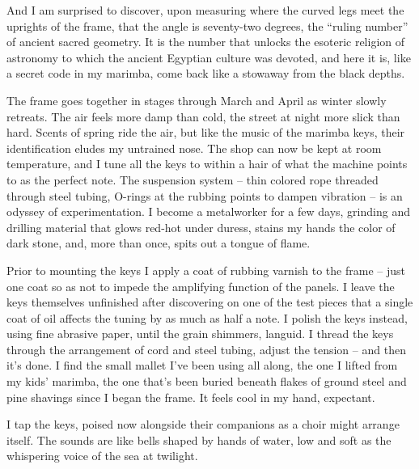 \documentclass[letterpaper,10pt,headsepline]{scrreprt}
\begin{document}
And I am surprised to discover, upon measuring where the curved legs meet the uprights of the frame, that the angle is seventy-­two degrees, the “ruling number” of ancient sacred geometry. It is the number that unlocks the esoteric religion of astronomy to which the ancient Egyptian culture was devoted, and here it is, like a secret code in my marimba, come back like a stowaway from the black depths.

The frame goes together in stages through March and April as winter slowly retreats. The air feels more damp than cold, the street at night more slick than hard. Scents of spring ride the air, but like the music of the marimba keys, their identification eludes my untrained nose. The shop can now be kept at room temperature, and I tune all the keys to within a hair of what the machine points to as the perfect note. The suspension system – thin colored rope threaded through steel tubing, O-­rings at the rubbing points to dampen vibration – is an odyssey of experimentation. I become a metalworker for a few days, grinding and drilling material that glows red-­hot under duress, stains my hands the color of dark stone, and, more than once, spits out a tongue of flame.

Prior to mounting the keys I apply a coat of rubbing varnish to the frame – just one coat so as not to impede the amplifying function of the panels. I leave the keys themselves unfinished after discovering on one of the test pieces that a single coat of oil affects the tuning by as much as half a note. I polish the keys instead, using fine abrasive paper, until the grain shimmers, languid.
I thread the keys through the arrangement of cord and steel tubing, adjust the tension – and then it’s done. I find the small mallet I’ve been using all along, the one I lifted from my kids’ marimba, the one that’s been buried beneath flakes of ground steel and pine shavings since I began the frame. It feels cool in my hand, expectant. 

I tap the keys, poised now alongside their companions as a choir might arrange itself. The sounds are like bells shaped by hands of water, low and soft as the whispering voice of the sea at twilight.
\end{document}
